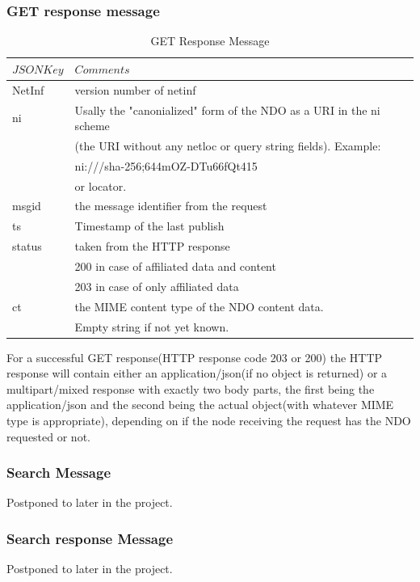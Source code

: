 \documentclass[11pt]{article}
\begin{document}
\subsubsection{GET response message}
\begin{table}[H]
\centering
\begin{tabular}{|l|l|}
\hline
$JSON Key $&$Comments$\\

\hline

NetInf&version number of netinf\\
\hline
ni&Usally the "canonialized" form of the NDO as a URI in the ni scheme\\
 &(the URI without any netloc or query string fields). Example:\\
  &ni:///sha-256;644mOZ-DTu66fQt415\\
    &or locator.\\
\hline
msgid&the message identifier from the request\\
\hline
ts&Timestamp of the last publish\\
\hline
status&taken from the HTTP response\\
 &200 in case of affiliated data and content\\
 &203 in case of only affiliated data\\
\hline
ct&the MIME content type of the NDO content data.\\
 &Empty string if not yet known.\\
\hline
\end{tabular}

\label{table:tab4}
\caption{GET Response Message}
\end{table}
For a successful GET response(HTTP response code 203 or 200) the HTTP response will contain either an application/json(if no object is returned) or a multipart/mixed response with exactly two body parts, the first being the application/json and the second being the actual object(with whatever MIME type is appropriate), depending on if the node receiving the request has the NDO requested or not.\\







\subsubsection{Search Message}
Postponed to later in the project.\\

\subsubsection{Search response Message}
Postponed to later in the project.\\
\end{document}
